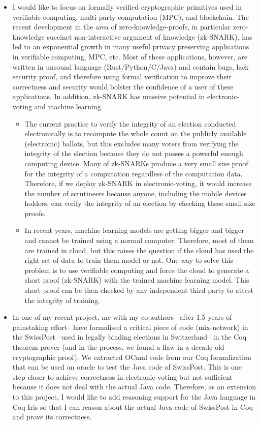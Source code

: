 \documentclass[a4paper]{article}
\begin{document}
\begin{itemize}
    \item I would like to focus  
	on formally verified cryptographic primitives used in
	verifiable computing, multi-party computation (MPC), and blockchain. 
    The recent development in the area of zero-knowledge-proofs, in particular 
	zero-knowledge succinct non-interactive argument of knowledge (zk-SNARK), 
	has led to an exponential growth in many useful 
	privacy preserving applications in verifiable computing, MPC, etc. Most of these 
	applications, however, are written 
	in unsound language (Rust/Python/C/Java) and contain bugs,
	lack security proof, and therefore using formal verification 
	to improve their correctness and security would bolster the 
	confidence of a user of these applications.
	In addition, zk-SNARK has massive potential in electronic-voting and machine learning. 
	\begin{itemize}
		\item The current practice to verify the integrity of an election conducted electronically is to 
		recompute the whole count on the publicly available (electronic) ballots, but 
		this excludes many voters from verifying the integrity of the election because 
		they do not posses a powerful enough computing device. Many of 
		zk-SNARKs produce a very small size proof for the integrity of a computation 
		regardless of the computation data. Therefore, if we deploy zk-SNARK in 
		electronic-voting, it would increase the number of scrutineers because anyone, including the 
		mobile devices holders, can verify the integrity of an election by checking these small size proofs. 
		\item In recent years, 
   machine learning models are getting bigger and bigger and cannot be trained using a normal computer. 
   Therefore, most of them are trained in cloud, but this 
   raises the question if the cloud has used the right set of data to train them model or not. 
   One way to solve this problem is to use verifiable computing and force the cloud to generate 
   a short proof (zk-SNARK) with the trained machine learning model. 
   This short proof can be then checked by any independent third party to attest the 
   integrity of training. 
	\end{itemize}

\item In one of my recent project, me with my co-authors --after 1.5 years of 
painstaking effort-- have formalised a critical 
piece of code (mix-network) in the SwissPost --used in legally binding elections 
in Switzerland-- in the Coq theorem prover (and in the process, we found a flaw in a decade 
old cryptographic proof). We extracted OCaml code from our Coq formalization that 
can be used an oracle to test the Java code of SwissPost. This is one step closer to 
achieve correctness in electronic voting but not sufficient because it does not 
deal with the actual Java code. Therefore, as an extension to this project, 
I would like to add reasoning support for the Java language in Coq-Iris so that I can 
reason about the actual Java code of SwissPost in Coq and prove 
its correctness.

\end{itemize}
\end{document}
